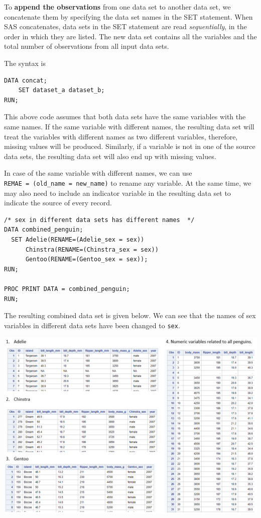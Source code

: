 \documentclass[
]{book}
\begin{document}
To \textbf{append the observations} from one data set to another data set, we concatenate them by specifying the data set names in the SET statement. When SAS concatenates, data sets in the SET statement are read \emph{sequentially}, in the order in which they are listed. The new data set contains all the variables and the total number of observations from all input data sets.

The syntax is

\begin{verbatim}
DATA concat;
    SET dataset_a dataset_b;
RUN;
\end{verbatim}

This above code assumes that both data sets have the same variables with the same names. If the same variable with different names, the resulting data set will treat the variables with different names as two different variables, therefore, missing values will be produced. Similarly, if a variable is not in one of the source data sets, the resulting data set will also end up with missing values.

In case of the same variable with different names, we can use \texttt{REMAE\ =\ (old\_name\ =\ new\_name)} to rename any variable. At the same time, we may also need to include an indicator variable in the resulting data set to indicate the source of every record.

\begin{verbatim}
/* sex in different data sets has different names  */
DATA combined_penguin;
  SET Adelie(RENAME=(Adelie_sex = sex))
      Chinstra(RENAME=(Chinstra_sex = sex))
      Gentoo(RENAME=(Gentoo_sex = sex));
RUN; 

PROC PRINT DATA = combined_penguin;
RUN;
\end{verbatim}

The resulting combined data set is given below. We can see that the names of sex variables in different data sets have been changed to \texttt{sex}.

\begin{center}\includegraphics[width=1\linewidth]{img08/w08-workingDataSet} \end{center}
\end{document}
